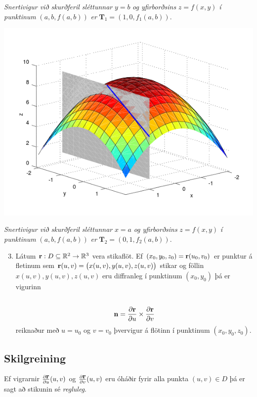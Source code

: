 \documentclass[a4paper,10pt,icelandic]{sphinxmanual}
\begin{document}
\emph{Snertivigur við skurðferil sléttunnar} \(y=b\) \emph{og yfirborðsins} \(z = f(x,y)\) \emph{í punktinum} \((a,b,f(a,b))\) \emph{er} \(\mathbf{T}_1 = (1,0,f_1(a,b))\).

{\hfill\includegraphics[width=0.700\linewidth]{ypart.png}\hfill}

\emph{Snertivigur við skurðferil sléttunnar} \(x=a\) \emph{og yfirborðsins} \(z = f(x,y)\) \emph{í punktinum} \((a,b,f(a,b))\) \emph{er} \(\mathbf{T}_2 = (0,1,f_2(a,b))\).
\begin{enumerate}
\setcounter{enumi}{2}
\item {} 
Látum
\(\mbox{${\bf r}$}: D\subseteq {\mathbb  R}^2\rightarrow {\mathbb  R}^3\)
vera stikaflöt. Ef \((x_0, y_0, z_0)=\mbox{${\bf r}$}(u_0, v_0)\)
er punktur á fletinum sem
\(\mbox{${\bf r}$}(u,v)=\big(x(u,v), y(u,v), z(u,v)\big)\) stikar
og föllin \(x(u,v), y(u,v), z(u,v)\) eru diffranleg í punktinum
\((x_0,
y_0)\) þá er vigurinn
\begin{gather}
\begin{split}\displaystyle\end{split}\notag\\\begin{split}\mbox{${\bf n}$}=\frac{\partial \mbox{${\bf r}$}}{\partial u}\times
\frac{\partial \mbox{${\bf r}$}}{\partial v}\end{split}\notag
\end{gather}
reiknaður með \(u=u_0\) og \(v=v_0\) þvervigur á flötinn í
punktinum \((x_0, y_0, z_0)\).

\end{enumerate}


\subsection{Skilgreining}
\label{Kafli5:id18}
Ef vigrarnir \(\frac{\partial \mbox{${\bf r}$}}{\partial u}(u,v)\)
og \(\frac{\partial \mbox{${\bf r}$}}{\partial v}(u,v)\) eru óháðir
fyrir alla punkta \((u,v)\in D\) þá er sagt að stikunin sé
\emph{regluleg}.
\end{document}
